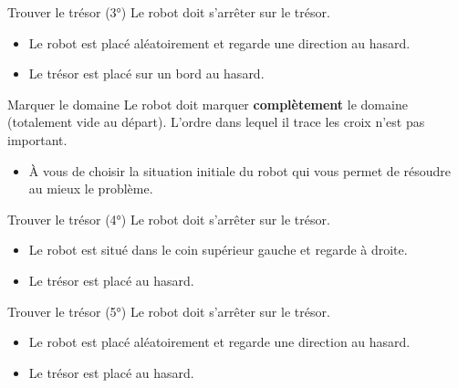 		\begin{Exercice}{Trouver le trésor (3°)}
			Le robot doit s’arrêter sur le trésor.

			\begin{itemize}
			\item Le robot est placé aléatoirement et regarde une direction au hasard.
			\item Le trésor est placé sur un bord au hasard.
			\end{itemize}
		\end{Exercice}

		\begin{Exercice}{Marquer le domaine}
			Le robot doit marquer \textbf{complètement} le domaine
			(totalement vide au départ). 
			L’ordre dans lequel il trace les croix n’est pas important.

			\begin{itemize}
			\item
				À vous de choisir la situation initiale du robot qui vous permet de
				résoudre au mieux le problème.
			\end{itemize}
		\end{Exercice}

		\begin{Exercice}{Trouver le trésor (4°)}
			Le robot doit s’arrêter sur le trésor.

			\begin{itemize}
			\item Le robot est situé dans le coin supérieur gauche et regarde à droite.
			\item Le trésor est placé au hasard.
			\end{itemize}
		\end{Exercice}

		\begin{Exercice}{Trouver le trésor (5°)}
			Le robot doit s’arrêter sur le trésor.

			\begin{itemize}
			\item Le robot est placé aléatoirement et regarde une direction au hasard.
			\item Le trésor est placé au hasard.
			\end{itemize}
		\end{Exercice}
			
